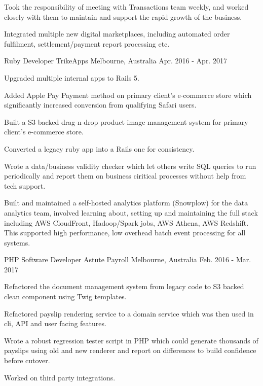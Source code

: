 \begin{cventries}
{\begin{cvitems}
        \item {Took the responsibility of meeting with Transactions team weekly, and worked closely with them to maintain and support the rapid growth of the business.}
        \item {Integrated multiple new digital marketplaces, including automated order fulfilment, settlement/payment report processing etc.}
      \end{cvitems}
    }
  \cventry
    {Ruby Developer} %
    {TrikeApps} %
    {Melbourne, Australia} %
    {Apr. 2016 - Apr. 2017} %
    {
      \begin{cvitems} %
        \item {Upgraded multiple internal apps to Rails 5.}
        \item {Added Apple Pay Payment method on primary client's e-commerce store which significantly increased conversion from qualifying Safari users.}
        \item {Built a S3 backed drag-n-drop product image management system for primary client's e-commerce store.}
        \item {Converted a legacy ruby app into a Rails one for consistency.}
        \item {Wrote a data/business validity checker which let others write SQL queries to run periodically and report them on business ciritical processes without help from tech support.}
        \item {Built and maintained a self-hosted analytics platform (Snowplow) for the data analytics team, involved learning about, setting up and maintaining the full stack including AWS CloudFront, Hadoop/Spark jobs, AWS Athena, AWS Redshift. This supported high performance, low overhead batch event processing for all systems.}
      \end{cvitems}
    }
  \cventry
    {PHP Software Developer} %
    {Astute Payroll} %
    {Melbourne, Australia} %
    {Feb. 2016 - Mar. 2017} %
    {
      \begin{cvitems} %
        \item {Refactored the document management system from legacy code to S3 backed clean component using Twig templates.}
        \item {Refactored payslip rendering service to a domain service which was then used in cli, API and user facing features.}
        \item {Wrote a robust regression tester script in PHP which could generate thousands of payslips using old and new renderer and report on differences to build confidence before cutover.}
        \item {Worked on third party integrations.}
      \end{cvitems}
    }


\end{cventries}
